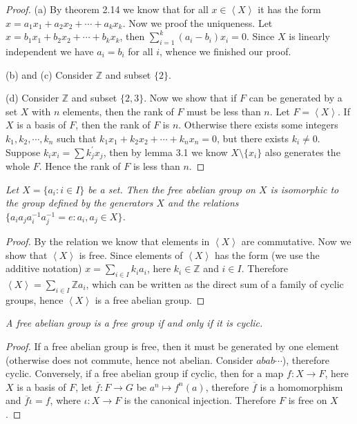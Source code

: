 \begin{proof}
(a) By theorem 2.14 we know that for all $x\in\left<X\right>$ it has the form $x=a_1x_1+a_2x_2+\cdots+a_kx_k$. Now we proof the uniqueness. Let $x=b_1x_1+b_2x_2+\cdots+b_kx_k$, then $\sum_{i=1}^k(a_i-b_i)x_i=0$. Since $X$ is linearly independent we have $a_i=b_i$ for all $i$, whence we finished our proof.\par
(b) and (c) Consider $\mathbb{Z}$ and subset $\{2\}$.\par
(d) Consider $\mathbb{Z}$ and subset $\{2,3\}$. Now we show that if $F$ can be generated by a set $X$ with $n$ elements, then the rank of $F$ must be less than $n$. Let $F=\left<X\right>$. If $X$ is a basis of $F$, then the rank of $F$ is $n$. Otherwise there exists some integers $k_1,k_2,\cdots,k_n$ such that $k_1x_1+k_2x_2+\cdots+k_nx_n=0$, but there exists $k_i\ne 0$. Suppose $k_ix_i=\sum k_j^\prime x_j$, then by lemma 3.1 we know $X\setminus\{x_i\}$ also generates the whole $F$. Hence the rank of $F$ is less than $n$.
\end{proof}
\begin{problem}\em
Let $X=\{a_i:i\in I\}$ be a set. Then the free abelian group on $X$ is isomorphic to the group defined by the generators $X$ and the relations $\{a_ia_ja_i^{-1}a_j^{-1}=e:a_i,a_j\in X\}$.
\end{problem}
\begin{proof}
By the relation we know that elements in $\left<X\right>$ are commutative. Now we show that $\left<X\right>$ is free. Since elements of $\left<X\right>$ has the form (we use the additive notation) $x=\sum_{i\in I}k_ia_i$, here $k_i\in\mathbb{Z}$ and $i\in I$. Therefore $\left<X\right>=\sum_{i\in I}\mathbb{Z}a_i$, which can be written as the direct sum of a family of cyclic groups, hence $\left<X\right>$ is a free abelian group.
\end{proof}
\begin{problem}\em
A free abelian group is a free group if and only if it is cyclic.
\end{problem}
\begin{proof}
If a free abelian group is free, then it must be generated by one element (otherwise does not commute, hence not abelian. Consider $abab\cdots$), therefore cyclic. Conversely, if a free abelian group if cyclic, then for a map $f:X\to F$, here $X$ is a basis of $F$, let $\overline{f}:F\to G$ be $a^n\mapsto f^n(a)$, therefore $\overline{f}$ is a homomorphism and $\overline{f}\iota=f$, where $\iota:X\to F$ is the canonical injection. Therefore $F$ is free on $X$.
\end{proof}
